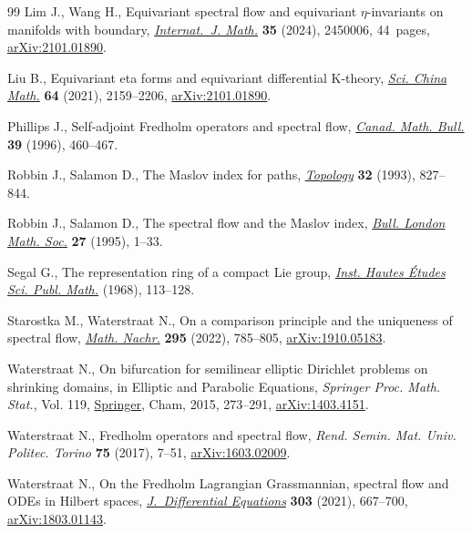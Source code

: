 \documentclass[pdftex]{sigma}
\numberwithin{equation}{section}
\theoremstyle{definition}
\begin{document}
\begin{thebibliography}{99}
Lim J., Wang H., Equivariant spectral flow and equivariant {$\eta$}-invariants
 on manifolds with boundary,
 \href{https://doi.org/10.1142/S0129167X2450006X}{\textit{Internat.~J. Math.}}
 \textbf{35} (2024), 2450006, 44~pages,
 \href{http://arxiv.org/abs/2101.01890}{arXiv:2101.01890}.

Liu B., Equivariant eta forms and equivariant differential {K}-theory,
 \href{https://doi.org/10.1007/s11425-020-1852-5}{\textit{Sci. China Math.}}
 \textbf{64} (2021), 2159--2206,
 \href{http://arxiv.org/abs/2101.01890}{arXiv:2101.01890}.

Phillips J., Self-adjoint {F}redholm operators and spectral flow,
 \href{https://doi.org/10.4153/CMB-1996-054-4}{\textit{Canad. Math. Bull.}}
 \textbf{39} (1996), 460--467.

Robbin J., Salamon D., The {M}aslov index for paths,
 \href{https://doi.org/10.1016/0040-9383(93)90052-W}{\textit{Topology}}
 \textbf{32} (1993), 827--844.

Robbin J., Salamon D., The spectral flow and the {M}aslov index,
 \href{https://doi.org/10.1112/blms/27.1.1}{\textit{Bull. London Math. Soc.}}
 \textbf{27} (1995), 1--33.

Segal G., The representation ring of a compact {L}ie group,
 \href{https://doi.org/10.1007/BF02684592}{\textit{Inst. Hautes \'{E}tudes
 Sci. Publ. Math.}} (1968), 113--128.

Starostka M., Waterstraat N., On a comparison principle and the uniqueness of
 spectral flow, \href{https://doi.org/10.1002/mana.201900444}{\textit{Math.
 Nachr.}} \textbf{295} (2022), 785--805,
 \href{http://arxiv.org/abs/1910.05183}{arXiv:1910.05183}.

Waterstraat N., On bifurcation for semilinear elliptic {D}irichlet problems on
 shrinking domains, in Elliptic and Parabolic Equations, \textit{Springer
 Proc. Math. Stat.}, Vol. 119,
 \href{https://doi.org/10.1007/978-3-319-12547-3_12}{Springer}, Cham, 2015,
 273--291, \href{http://arxiv.org/abs/1403.4151}{arXiv:1403.4151}.

Waterstraat N., Fredholm operators and spectral flow, \textit{Rend. Semin. Mat.
 Univ. Politec. Torino} \textbf{75} (2017), 7--51,
 \href{http://arxiv.org/abs/1603.02009}{arXiv:1603.02009}.

Waterstraat N., On the {F}redholm {L}agrangian {G}rassmannian, spectral flow
 and {ODE}s in {H}ilbert spaces,
 \href{https://doi.org/10.1016/j.jde.2021.09.024}{\textit{J.~Differential
 Equations}} \textbf{303} (2021), 667--700,
 \href{http://arxiv.org/abs/1803.01143}{arXiv:1803.01143}.

\end{thebibliography}\LastPageEnding
\end{document}
